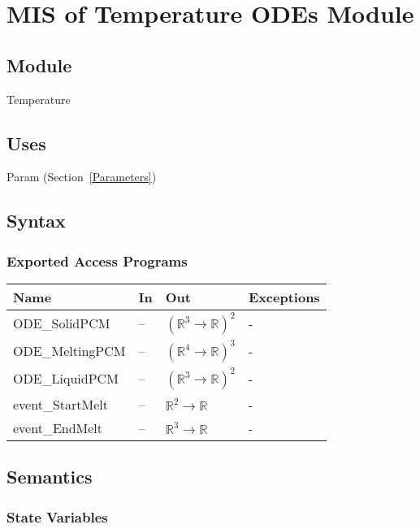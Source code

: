 \documentclass[12pt, titlepage]{article}
\begin{document}
\newpage
\section{MIS of Temperature ODEs Module} \label{Temperature}

\subsection{Module}

Temperature

\subsection{Uses}

Param (Section~\ref{Parameters})

\subsection{Syntax}

\subsubsection{Exported Access Programs}

\begin{center}
\begin{tabular}{p{3.5cm} p{1cm} p{7cm} p{2cm}}
\hline
\textbf{Name} & \textbf{In} & \textbf{Out} & \textbf{Exceptions} \\
\hline
ODE\_SolidPCM & -- & $(\mathbb{R}^{3} \rightarrow \mathbb{R})^2$ & - \\
\hline
ODE\_MeltingPCM & -- &  $(\mathbb{R}^{4} \rightarrow \mathbb{R})^3$ & - \\
\hline
ODE\_LiquidPCM & -- & $(\mathbb{R}^{3} \rightarrow \mathbb{R})^2$ & - \\
\hline
event\_StartMelt & -- & $\mathbb{R}^2 \rightarrow \mathbb{R}$ & - \\
\hline
event\_EndMelt & -- & $\mathbb{R}^3 \rightarrow \mathbb{R}$ & - \\
\hline
\end{tabular}
\end{center}

\subsection{Semantics}

\subsubsection{State Variables}
\end{document}
